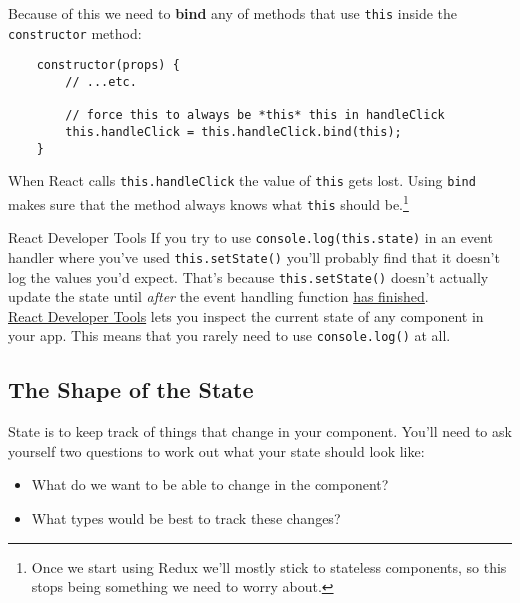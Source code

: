 Because of this we need to \textbf{bind} any of methods that use \texttt{this} inside the \texttt{constructor} method:

\begin{verbatim}
    constructor(props) {
        // ...etc.

        // force this to always be *this* this in handleClick
        this.handleClick = this.handleClick.bind(this);
    }
\end{verbatim}

 When React calls \texttt{this.handleClick} the value of \texttt{this} gets lost. Using \texttt{bind} makes sure that the method always knows what \texttt{this} should be.\footnote{Once we start using Redux we'll mostly stick to stateless components, so this stops being something we need to worry about.}


\pagebreak

\begin{infobox}{React Developer Tools}
    If you try to use \texttt{console.log(this.state)} in an event handler where you've used \texttt{this.setState()} you'll probably find that it doesn't log the values you'd expect. That's because \texttt{this.setState()} doesn't actually update the state until \textit{after} the event handling function \href{https://medium.com/@baphemot/understanding-reactjs-setstate-a4640451865b}{has finished}.
    \\

    \href{https://github.com/facebook/react-devtools}{React Developer Tools} lets you inspect the current state of any component in your app. This means that you rarely need to use \texttt{console.log()} at all.
\end{infobox}



\subsection{The Shape of the State}

State is to keep track of things that change in your component. You'll need to ask yourself two questions to work out what your state should look like:

\begin{itemize}
    \item What do we want to be able to change in the component?
    \item What types would be best to track these changes?
\end{itemize}

